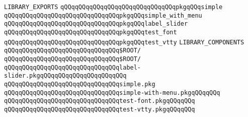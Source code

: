 \label{src/lib/x-kit/tut/widget/widgets.lib}
\verb|LIBRARY_EXPORTS|\newline
\newline
\verb|qQQqqQQqqQQqqQQqqQQqqQQqqQQqqQQqpkgqQQqsimple|\newline
\verb|qQQqqQQqqQQqqQQqqQQqqQQqqQQqqQQqpkgqQQqsimple_with_menu|\newline
\verb|qQQqqQQqqQQqqQQqqQQqqQQqqQQqqQQqpkgqQQqlabel_slider|\newline
\verb|qQQqqQQqqQQqqQQqqQQqqQQqqQQqqQQqpkgqQQqtest_font|\newline
\verb|qQQqqQQqqQQqqQQqqQQqqQQqqQQqqQQqpkgqQQqtest_vtty|\newline
\newline
\verb|LIBRARY_COMPONENTS|\newline
\newline
\verb|qQQqqQQqqQQqqQQqqQQqqQQqqQQqqQQq$ROOT/|\newline
\verb|qQQqqQQqqQQqqQQqqQQqqQQqqQQqqQQq$ROOT/|\newline
\newline
\verb|qQQqqQQqqQQqqQQqqQQqqQQqqQQqqQQqlabel-slider.pkgqQQqqQQqqQQqqQQqqQQqqQQq|\newline
\verb|qQQqqQQqqQQqqQQqqQQqqQQqqQQqqQQqsimple.pkg|\newline
\verb|qQQqqQQqqQQqqQQqqQQqqQQqqQQqqQQqsimple-with-menu.pkgqQQqqQQq|\newline
\verb|qQQqqQQqqQQqqQQqqQQqqQQqqQQqqQQqtest-font.pkgqQQqqQQq|\newline
\verb|qQQqqQQqqQQqqQQqqQQqqQQqqQQqqQQqtest-vtty.pkgqQQqqQQq|\newline

